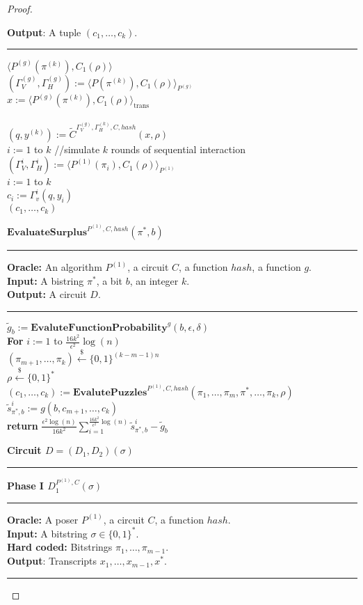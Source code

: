 \begin{proof}
\begin{codeblock}
  \textbf{Output}: A tuple $(c_1, \dots, c_k)$.
  \medskip\hrule\medskip
  \Run $\langle P^{(g)}(\pi^{(k)}), C_1(\rho) \rangle$ \\
  \IndI $(\Gamma_V^{(g)}, \Gamma_H^{(g)}) := \langle P(\pi^{(k)}), C_1(\rho) \rangle_{P^{(g)}}$ \\
  \IndI $x := \langle P^{(g)}(\pi^{(k)}), C_1(\rho) \rangle_{\text{trans}}$ \\ \\
  $(q,y^{(k)}) := \widetilde{C}^{\Gamma_V^{(g)}, \Gamma_H^{(k)}, C, hash}(x, \rho)$\\
  \For $i:=1$ to $k$ \Do \IndII //simulate $k$ rounds of sequential interaction \\
  \IndI $(\Gamma_V^{i}, \Gamma_H^{i}) := \langle P^{(1)}(\pi_i), C_1(\rho) \rangle_{P^{(1)}} $\\
  \For $i:=1$ to $k$ \Do \\
  \IndI $c_i := \Gamma_v^{i}(q, y_i)$\\
  \return $(c_1, \dots, c_k)$
\end{codeblock}
%
\begin{codeblock}
  $\textbf{EvaluateSurplus}^{P^{(1)}, C, hash}(\pi^*, b)$
  \medskip
  \hrule
  \medskip
  \textbf{Oracle:} An algorithm $P^{(1)}$, a circuit $C$, a function $hash$, a function $g$.\\
  \textbf{Input:} A bistring $\pi^*$, a bit $b$, an integer $k$.\\
  \textbf{Output:} A circuit $D$.
  \medskip\hrule\medskip
  $\widetilde{g}_b := \textbf{EvaluteFunctionProbability}^{g}(b, \epsilon, \delta)$ \\
  \textbf{For} $i:=1$ to $\frac{16k^2}{\epsilon^2}\log(n)$ \Do \\
  \IndI $(\pi_{m+1}, \dots, \pi_k) \xleftarrow{\$} \{0,1\}^{(k-m-1)n}$\\
  \IndI $\rho \xleftarrow{\$} \{0,1\}^{*}$\\
  \IndI $(c_1, \dots, c_k) := \textbf{EvalutePuzzles}^{P^{(1)}, C, hash}(\pi_1, \dots, \pi_{m}, \pi^*, \dots, \pi_k, \rho)$\\
  \IndI $\widetilde{s}_{\pi^*,b}^i := g(b, c_{m+1}, \dots, c_k)$\\
  \textbf{return} $\frac{\epsilon^2\log(n)}{16k^2} \sum_{i=1}^{\frac{16k^2}{\epsilon^2}\log(n)} \widetilde{s}_{\pi^*,b}^i - \widetilde{g}_b$\\
\end{codeblock}
%
\begin{codeblock}
  \textbf{Circuit $D = (D_1, D_2) (\sigma)$}
  \medskip \hrule \medskip
  \textbf{Phase I $D_1^{P^{(1)}, C}(\sigma)$}
  \medskip \hrule \medskip
  \textbf{Oracle:} A poser $P^{(1)}$, a circuit $C$, a function $hash$.\\
  \textbf{Input:} A bitstring $\sigma \in \{0,1\}^{*}$.\\
  \textbf{Hard coded:} Bitstrings $\pi_1, \dots, \pi_{m-1}$. \\
  \textbf{Output}: Transcripts $x_1, \dots, x_{m-1}, x^*$.
  \medskip\hrule\medskip


\end{codeblock}
\end{proof}
